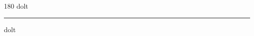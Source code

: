 
\begin{frame}
\begin{center}
\begin{turn}{180}
{\fontsize{2.5cm}{1em}\selectfont dolt}
\end{turn}
\vspace{1em}\par  
\hrule
\vspace{1em}\par  
{\fontsize{2.5cm}{1em}\selectfont dolt}
\end{center}
\end{frame}
